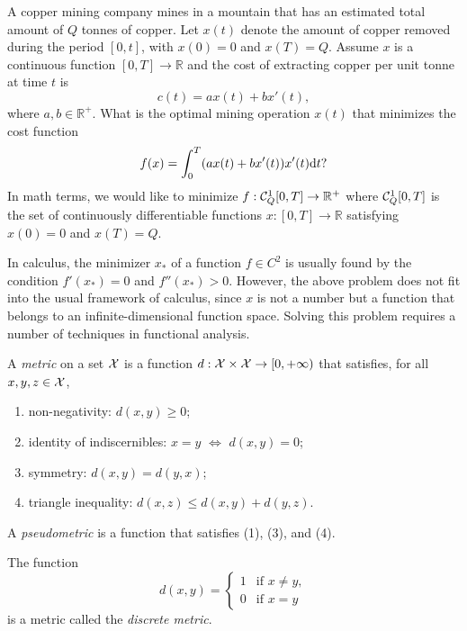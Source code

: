 \begin{exm}
  \label{exm:funcAnalExm}
  A copper mining company mines in a mountain
  that has an estimated total amount of $Q$ tonnes of copper.
  Let $x(t)$ denote the amount of copper
  removed during the period $[0,t]$,
  with $x(0)=0$ and $x(T)=Q$.
  Assume $x$ is a continuous function $[0,T]\rightarrow \mathbb{R}$
  and the cost of extracting copper per unit tonne at time $t$ is
  \begin{equation}
    \label{eq:funcAnalExm}
    c(t) = a x(t) + bx'(t),    
  \end{equation}
  where $a,b\in \mathbb{R}^+$.
  What is the optimal mining operation $x(t)$
  that minimizes the cost function
  \begin{displaymath}
    f(x) = \int_0^T (ax(t)+bx'(t))x'(t)\mathrm{d} t? 
  \end{displaymath}
  In math terms, we would like to minimize
  $f: {\cal C}^1_Q[0,T]\rightarrow \mathbb{R}^+$
  where ${\cal C}^1_Q[0,T]$ is the set
  of continuously differentiable functions
  $x: [0,T]\rightarrow \mathbb{R}$
  satisfying $x(0)=0$ and $x(T)=Q$.

  In calculus, the minimizer $x_*$
  of a function $f\in C^2$  is usually found
  by the condition $f'(x_*)=0$ and $f''(x_*)>0$.
  However, the above problem does not fit into
  the usual framework of calculus,
  since $x$ is not a number but a function
  that belongs to an infinite-dimensional
  function space.
  Solving this problem requires a number of techniques
  in functional analysis.
\end{exm}



\begin{defn}
  \label{def:metric}
  A \emph{metric} on a set ${\cal X}$ is a function
   $d:{\cal X}\times{\cal X}\rightarrow [0,+\infty)$
   that satisfies, for all $x,y,z\in {\cal X}$, 
   \begin{enumerate}[(1)]\itemsep0em
   \item non-negativity: $d(x,y)\ge 0$;
   \item identity of indiscernibles: $x=y$ $\Leftrightarrow$ $d(x,y)=0$;
   \item symmetry: $d(x,y)=d(y,x)$;
   \item triangle inequality: $d(x,z)\le d(x,y)+d(y,z)$.
   \end{enumerate}
  A \emph{pseudometric} is a function
   that satisfies (1), (3), and (4). 
\end{defn}

\begin{exm}
  \label{exm:discreteMetric}
  The function
  \begin{equation}
    \label{eq:discreteMetric}
    d(x,y)=
    \begin{cases}
      1 & \text{if } x\ne y,
      \\
      0 & \text{if } x= y
    \end{cases}
  \end{equation}
   is a metric called the \emph{discrete metric}.
\end{exm}


